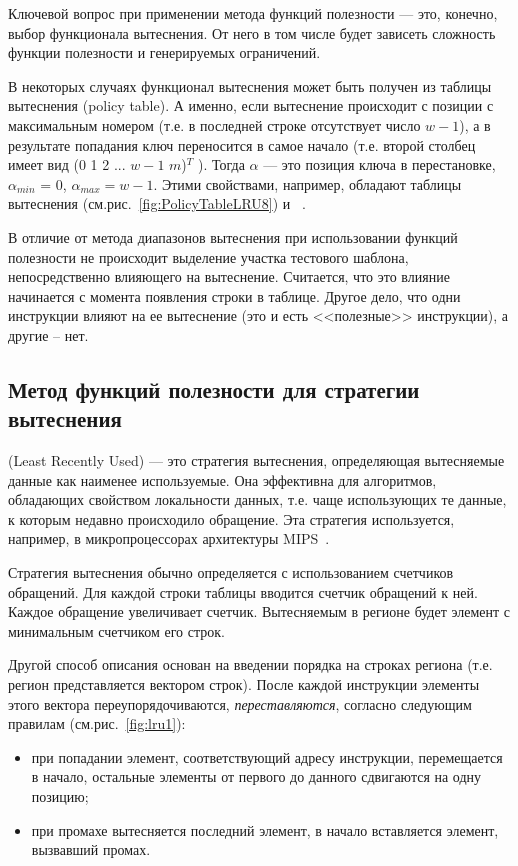 Ключевой вопрос при применении метода функций полезности --- это, конечно, выбор
функционала вытеснения. От него в том числе будет зависеть сложность функции
полезности и генерируемых ограничений.

В некоторых случаях функционал вытеснения может быть получен из таблицы вытеснения
(policy table). А именно, если вытеснение происходит с позиции с максимальным
номером (т.е. в последней строке отсутствует число $w{-}1$), а в результате
попадания ключ переносится в самое начало (т.е. второй столбец имеет вид (0 1 2
... $w{-}1$ $m$)$^T$ ). Тогда $\alpha$ --- это позиция ключа в перестановке,
$\alpha_{min}$ = 0, $\alpha_{max} = w{-}1$. Этими свойствами, например, обладают
таблицы вытеснения \LRU (см.рис.~\ref{fig:PolicyTableLRU8}) и
\PseudoLRU~\cite{policy_tables}.

В отличие от метода диапазонов вытеснения при использовании функций полезности
не происходит выделение участка тестового шаблона, непосредственно влияющего на
вытеснение. Считается, что это влияние начинается с момента появления строки в
таблице. Другое дело, что одни инструкции влияют на ее вытеснение (это и есть
<<полезные>> инструкции), а другие -- нет.


\subsection{Метод функций полезности для стратегии вытеснения \LRU}

\LRU (Least Recently Used) --- это стратегия вытеснения,
определяющая вытесняемые данные как наименее используемые. Она
эффективна для алгоритмов, обладающих свойством локальности данных,
т.е. чаще использующих те данные, к которым недавно происходило
обращение. Эта стратегия используется, например, в микропроцессорах
архитектуры MIPS~\cite{mips64II}.

Стратегия вытеснения \LRU обычно определяется с использованием
счетчиков обращений. Для каждой строки таблицы
вводится счетчик обращений к ней. Каждое обращение увеличивает
счетчик. Вытесняемым в регионе будет элемент с минимальным счетчиком его строк.

Другой способ описания \LRU основан на введении порядка на строках региона (т.е.
регион представляется вектором строк). После каждой инструкции элементы этого вектора переупорядочиваются, \emph{переставляются}, согласно следующим правилам (см.рис.~\ref{fig:lru1}):
\begin{itemize}
\item при попадании элемент, соответствующий адресу инструкции,
перемещается в начало, остальные элементы от первого до данного
сдвигаются на одну позицию;
\item при промахе вытесняется последний элемент, в начало
вставляется элемент, вызвавший промах.
\end{itemize}

